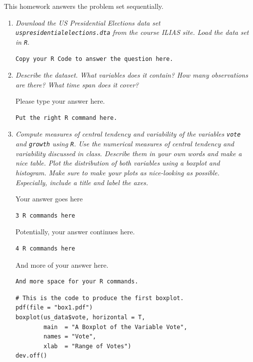 \documentclass[a4paper,12pt]{article} %
\begin{document}
This homework answers the problem set sequentially. 

\begin{enumerate}

\item {\it Download the US Presidential Elections data set {\tt uspresidentialelections.dta} from the course ILIAS site. Load the data set in {\tt R}}. %

\begin{verbatim}
Copy your R Code to answer the question here.
\end{verbatim}

\item {\it Describe the dataset. What variables does it contain? How many observations are there? What time span does it cover?}

Please type your answer here.

\begin{verbatim}
Put the right R command here.
\end{verbatim}

\newpage %
\item {\it Compute measures of central tendency and variability of the variables {\tt vote} and {\tt growth} using {\tt R}. Use the numerical measures of central tendency and variability discussed in class. Describe them in your own words and make a nice table. Plot the distribution of both variables using a boxplot and histogram. Make sure to make your plots as nice-looking as possible. Especially, include a title and label the axes.}

Your answer goes here

\begin{verbatim}
3 R commands here
\end{verbatim}

Potentially, your answer continues here.

\begin{verbatim}
4 R commands here
\end{verbatim}

And more of your answer here.

\begin{verbatim}
And more space for your R commands.
\end{verbatim}

\begin{verbatim}
# This is the code to produce the first boxplot.
pdf(file = "box1.pdf")
boxplot(us_data$vote, horizontal = T,
        main  = "A Boxplot of the Variable Vote",
        names = "Vote",
        xlab  = "Range of Votes")
dev.off()
\end{verbatim}


\end{enumerate}
\end{document}
